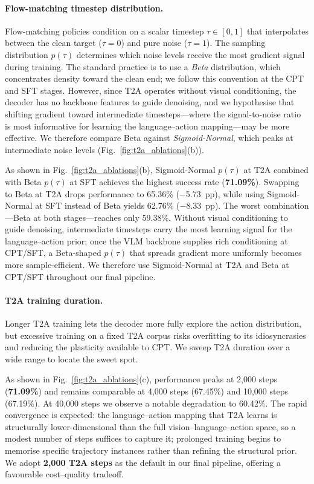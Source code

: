 \paragraph{Flow-matching timestep distribution.}

Flow-matching policies condition on a scalar timestep $\tau \in [0,1]$ that
interpolates between the clean target ($\tau{=}0$) and pure noise ($\tau{=}1$).
The sampling distribution $p(\tau)$ determines which noise levels receive the
most gradient signal during training. The standard practice is to use a \emph{Beta}
distribution, which concentrates density toward the clean end; we follow this
convention at the CPT and SFT stages.
However, since T2A operates without visual conditioning, the decoder has no
backbone features to guide denoising, and we hypothesise that shifting
gradient toward intermediate timesteps---where the signal-to-noise ratio is
most informative for learning the language--action mapping---may be more
effective.
We therefore compare Beta against \emph{Sigmoid-Normal}, which peaks at
intermediate noise levels (Fig.~\ref{fig:t2a_ablations}(b)).


As shown in Fig.~\ref{fig:t2a_ablations}(b), Sigmoid-Normal $p(\tau)$ at T2A
combined with Beta $p(\tau)$ at SFT achieves the highest success rate
(\textbf{71.09\%}).
Swapping to Beta at T2A drops performance to 65.36\% ($-$5.73~pp), while
using Sigmoid-Normal at SFT instead of Beta yields 62.76\% ($-$8.33~pp).
The worst combination---Beta at both stages---reaches only 59.38\%.
Without visual conditioning to guide denoising, intermediate timesteps carry
the most learning signal for the language--action prior;
once the VLM backbone supplies rich conditioning at CPT/SFT, a Beta-shaped
$p(\tau)$ that spreads gradient more uniformly becomes more sample-efficient.
We therefore use {Sigmoid-Normal at T2A} and {Beta at CPT/SFT}
throughout our final pipeline.

\paragraph{T2A training duration.}

Longer T2A training lets the decoder more fully explore the action
distribution, but excessive training on a fixed T2A corpus risks overfitting
to its idiosyncrasies and reducing the plasticity available to CPT.
We sweep T2A duration over a wide range to locate the sweet spot.

As shown in Fig.~\ref{fig:t2a_ablations}(c), performance peaks at
2{,}000 steps (\textbf{71.09\%}) and remains comparable at 4{,}000 steps
(67.45\%) and 10{,}000 steps (67.19\%).
At 40{,}000 steps we observe a notable degradation to 60.42\%.
The rapid convergence is expected: the language--action mapping that T2A
learns is structurally lower-dimensional than the full
vision--language--action space, so a modest number of steps suffices to
capture it; prolonged training begins to memorise specific trajectory
instances rather than refining the structural prior.
We adopt \textbf{2{,}000 T2A steps} as the default in our final pipeline,
offering a favourable cost--quality tradeoff.


